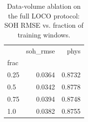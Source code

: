 \begin{table}
\caption{Data-volume ablation on the full LOCO protocol: SOH RMSE vs. fraction of training windows.}
\label{tab:ablation_data_volume}
\begin{tabular}{lrr}
\toprule
 & soh\_rmse & phys \\
frac &  &  \\
\midrule
0.25 & 0.0364 & 0.8732 \\
0.5 & 0.0342 & 0.8778 \\
0.75 & 0.0394 & 0.8748 \\
1.0 & 0.0382 & 0.8755 \\
\bottomrule
\end{tabular}
\end{table}
